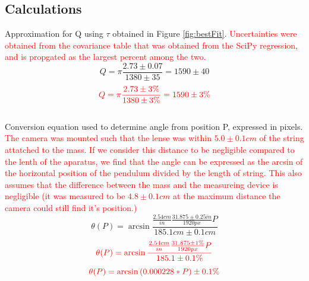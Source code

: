 \documentclass[11pt]{article}
\begin{document}
        \subsection{Calculations}\label{app:Calc}
            Approximation for Q using $\tau$ obtained in Figure \ref{fig:bestFit}. \textcolor{red}{Uncertainties were obtained from the covariance table that was obtained from the SciPy regression, and is propgated as the largest percent among the two.}
            \begin{equation}
                Q = \pi\frac{2.73 \pm 0.07}{1380 \pm 35} = 1590 \pm 40
                \label{calc:tauApprox}
            \end{equation}
            \begin{equation}
                \textcolor{red}{
                Q = \pi\frac{2.73 \pm 3\%}{1380 \pm 3\%} = 1590 \pm 3\% 
                }
                \label{calc:tauApprox}
            \end{equation}
            \\
            Conversion equation used to determine angle from position P, expressed in pixels. \textcolor{red}{The camera was mounted such that the lense was within $5.0 \pm 0.1cm$ of the string attatched to the mass. If we consider this distance to be negligible compared to the lenth of the aparatus, we find that the angle can be expressed as the arcsin of the horizontal position of the pendulum divided by the length of string. This also assumes that the difference between the mass and the measureing device is negligible (it was measured to be $4.8 \pm 0.1cm$ at the maximum distance the camera could still find it's position.)}
            \begin{equation}
                \theta(P) = \arcsin{\frac{\frac{2.54cm}{in}\frac{31.875 \pm 0.25in}{1920px} P}{185.1cm \pm 0.1cm}} 
                \label{calc:thetaApprox}
            \end{equation}
            \begin{equation}
                \textcolor{red}{
                \theta(P) = \arcsin{\frac{\frac{2.54cm}{in}\frac{31.875 \pm 1\%}{1920px} P}{185.1 \pm 0.1\%}} 
            }
            \end{equation}
            \begin{equation}
                \textcolor{red}{
                \theta(P) = \arcsin{(0.000228 * P)} \pm 0.1\% 
            }
            \end{equation}
            
\end{document}
